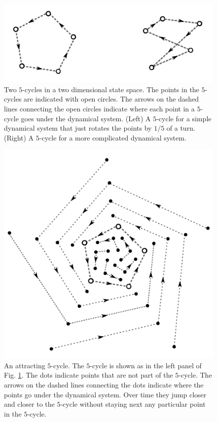 \begin{figure}[h]
\centering
\includegraphics[scale=.5]{./images/Two5-cycles.png}
\caption[Scott Hotton.]{Two $5$-cycles in a two dimensional state space.  The 
points in the $5$-cycles are indicated with open circles.  The arrows on the
dashed lines connecting the open circles indicate where each point in a 
$5$-cycle goes under the dynamical system.  (Left) A $5$-cycle for a simple 
dynamical system that just rotates the points by $1/5$ of a turn.  (Right) A 
$5$-cycle for a more complicated dynamical system.}
\label{F:Two5cycles}
\end{figure}

\begin{figure}[h]
\centering
\includegraphics[scale=.4]{./images/Attracting5-cycle.png}
\caption[Scott Hotton.]{An attracting $5$-cycle.  The $5$-cycle is shown as in 
the left panel of Fig. \ref{F:Two5cycles}.  The dots indicate points that are 
not part of the $5$-cycle.  The arrows on the dashed lines connecting the dots 
indicate where the points go under the dynamical system.  Over time they jump 
closer and closer to the $5$-cycle without staying next any particular point in 
the $5$-cycle.}
\label{F:Attracting5cycle}
\end{figure}

